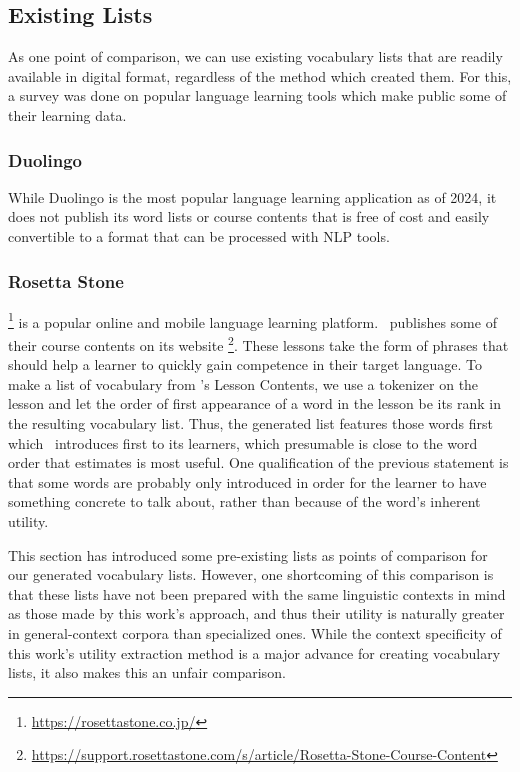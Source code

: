 \subsection{Existing Lists}
As one point of comparison, we can use existing vocabulary lists that are readily available in digital format, regardless of the method which created them.
For this, a survey was done on popular language learning tools which make public some of their learning data.




\subsubsection{Duolingo}
While Duolingo is the most popular language learning application as of 2024, it does not publish its word lists or course contents that is free of cost and easily convertible to a format that can be processed with NLP tools.

\subsubsection{Rosetta Stone}
\Rosetta \footnote{\url{https://rosettastone.co.jp/}} is a popular online and mobile language learning platform.
\Rosetta\ publishes some of their course contents on its website \footnote{\url{https://support.rosettastone.com/s/article/Rosetta-Stone-Course-Content}}.
These lessons take the form of phrases that should help a learner to quickly gain competence in their target language.
To make a list of vocabulary from \Rosetta 's Lesson Contents, we use a tokenizer on the lesson and let the order of first appearance of a word in the lesson be its rank in the resulting vocabulary list.
Thus, the generated list features those words first which \Rosetta\ introduces first to its learners, which presumable is close to the word order that \Rosetta estimates is most useful.
One qualification of the previous statement is that some words are probably only introduced in order for the learner to have something concrete to talk about, rather than because of the word's inherent utility.



This section has introduced some pre-existing lists as points of comparison for our generated vocabulary lists.
However, one shortcoming of this comparison is that these lists have not been prepared with the same linguistic contexts in mind as those made by this work's approach, and thus their utility is naturally greater in general-context corpora than specialized ones.
While the context specificity of this work's utility extraction method is a major advance for creating vocabulary lists, it also makes this an unfair comparison.

